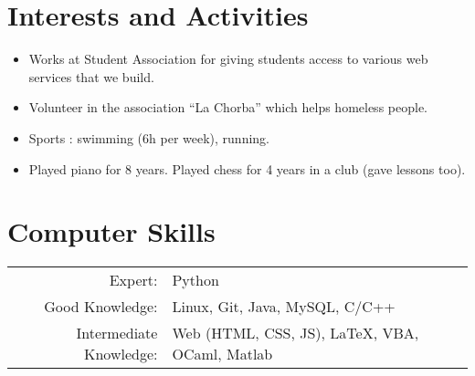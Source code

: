 \documentclass[a4paper,10pt]{article} %
\begin{document}
\section{Interests and Activities}

\begin{itemize}[noitemsep]
  \item Works at Student Association for giving students access to various web services that we build.
  \item Volunteer in the association ``La Chorba'' which helps homeless people.
  \item Sports : swimming (6h per week), running.
  \item Played piano for 8 years. Played chess for 4 years in a club (gave lessons too).
\end{itemize}



\section{Computer Skills}

\begin{tabular}{rl}
  Expert: & Python\\
  Good Knowledge: & Linux, Git, Java, MySQL, C/C++\\
  Intermediate Knowledge: & Web (HTML, CSS, JS), \LaTeX, VBA, OCaml, Matlab
\end{tabular}
\end{document}
